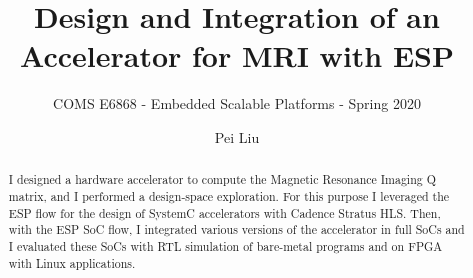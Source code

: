 \documentclass{sig-alternate}
\begin{document}
\title{Design and Integration of an Accelerator for MRI with ESP}
\subtitle{COMS E6868 - Embedded Scalable Platforms - Spring 2020}

\author{
\alignauthor
Pei Liu\\
}

\maketitle

\begin{abstract}

I designed a hardware accelerator to compute the Magnetic Resonance Imaging Q
matrix, and I performed a design-space exploration. For this purpose I leveraged
the ESP flow for the design of SystemC accelerators with Cadence Stratus
HLS. Then, with the ESP SoC flow, I integrated various versions of the
accelerator in full SoCs and I evaluated these SoCs with RTL simulation of
bare-metal programs and on FPGA with Linux applications.

\end{abstract}









{\small
\balance
%


}
\end{document}
